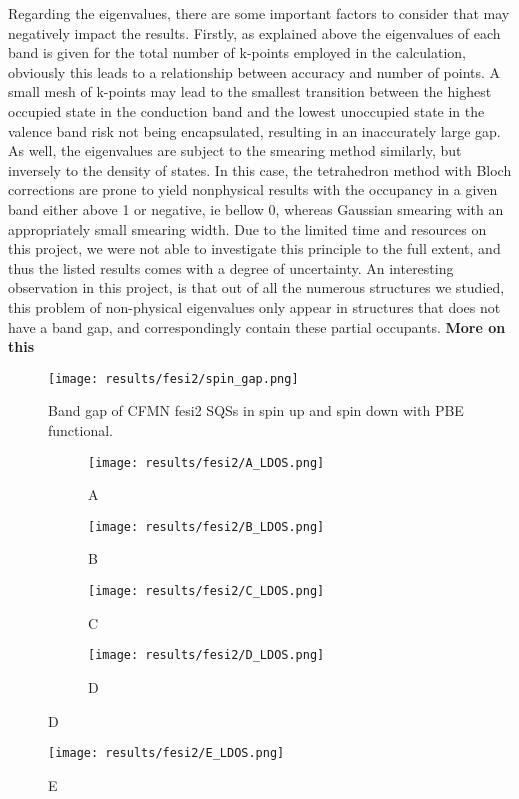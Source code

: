 Regarding the eigenvalues, there are some important factors to consider that may negatively impact the results. Firstly, as explained above the eigenvalues of each band is given for the total number of k-points employed in the calculation, obviously this leads to a relationship between accuracy and number of points. A small mesh of k-points may lead to the smallest transition between the highest occupied state in the conduction band and the lowest unoccupied state in the valence band risk not being encapsulated, resulting in an inaccurately large gap. As well, the eigenvalues are subject to the smearing method similarly, but inversely to the density of states. In this case, the tetrahedron method with Bloch corrections are prone to yield nonphysical results with the occupancy in a given band either above 1 or negative, ie bellow 0, whereas Gaussian smearing with an appropriately small smearing width. Due to the limited time and resources on this project, we were not able to investigate this principle to the full extent, and thus the listed results comes with a degree of uncertainty. An interesting observation in this project, is that out of all the numerous structures we studied, this problem of non-physical eigenvalues only appear in structures that does not have a band gap, and correspondingly contain these partial occupants. \textbf{More on this}

\begin{figure}[H]
\centering
\texttt{[image: results/fesi2/spin\_gap.png]}
\caption{Band gap of CFMN fesi2 SQSs in spin up and spin down with PBE functional.}
\label{DOS_hse06_B}
\end{figure}



\begin{figure}[H]
\centering
	\begin{subfigure}{\textwidth}
		\texttt{[image: results/fesi2/A\_LDOS.png]}
		\caption{A}
	\end{subfigure}
	\begin{subfigure}{\textwidth}
		\texttt{[image: results/fesi2/B\_LDOS.png]}
		\caption{B}
	\end{subfigure}
	\begin{subfigure}{\textwidth}
		\texttt{[image: results/fesi2/C\_LDOS.png]}
		\caption{C}
	\end{subfigure}
	\begin{subfigure}{\textwidth}
		\texttt{[image: results/fesi2/D\_LDOS.png]}
		\caption{D}
	\end{subfigure}
\end{figure}		
\begin{figure}[H]
	\centering	
	\texttt{[image: results/fesi2/E\_LDOS.png]}
	\caption{E}
\end{figure}


